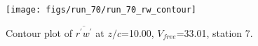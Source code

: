 \begin{figure}[H]
\centering
\texttt{[image: figs/run\_70/run\_70\_rw\_contour]}
\caption{Contour plot of $\overline{r^\prime w^\prime}$ at $z/c$=10.00, $V_{free}$=33.01, station 7.}
\label{fig:run_70_rw_contour}
\end{figure}


